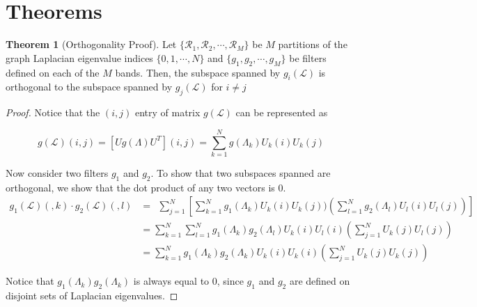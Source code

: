 \documentclass[a4paper]{article}
\newcommand{\R}{\mathcal{R}}
\renewcommand{\L}{\boldsymbol{\mathcal{L}}}
\theoremstyle{definition}
\newtheorem*{thm}{Theorem}
\begin{document}
\section{Theorems}
\begin{thm}[Orthogonality Proof]

Let $\{\R_1, \R_2, \cdots, \R_M\}$ be $M$ partitions of the graph Laplacian eigenvalue indices $\{0, 1, \cdots,  N \}$ and $\{g_1, g_2, \cdots, g_M \}$ be filters defined on each of the $M$ bands. Then, the subspace spanned by $g_i(\L)$ is orthogonal to the subspace spanned by $g_j(\L)$ for $i \neq j$

\end{thm}

\begin{proof}


Notice that the $(i,j)$ entry of matrix $g(\L)$ can be represented as 

$$g(\L) (i,j) = [Ug(\Lambda)U^T] (i,j) = \sum_{k = 1}^{N} g(\Lambda_k) U_k(i) U_k(j)$$

Now consider two filters $g_1$ and $g_2$. To show that two subspaces spanned are orthogonal, we show that the dot product of any two vectors is 0.
\begin{align*}
g_1(\L)(,k) \cdot g_2(\L)(,l)&=\ \  \sum_{j = 1}^{N} [\sum_{k = 1}^{N} g_1(\Lambda_k) U_k(i) U_k(j) )( \sum_{l = 1}^{N} g_2(\Lambda_l) U_l(i) U_l(j)) ] \\
& = \sum_{k = 1}^{N} \sum_{l = 1}^{N} g_1(\Lambda_k) g_2(\Lambda_l)  U_k(i) U_l(i) ( \sum_{j = 1}^{N}  U_k(j)  U_l(j))  \\
& = \sum_{k = 1}^{N} g_1(\Lambda_k) g_2(\Lambda_k)  U_k(i) U_k(i) ( \sum_{j = 1}^{N}  U_k(j)  U_k(j)) 
\end{align*}

Notice that $g_1(\Lambda_k) g_2(\Lambda_k)$ is always equal to $0$, since $g_1$ and $g_2$ are defined on disjoint sets of Laplacian eigenvalues.   

\end{proof}






\end{document}
